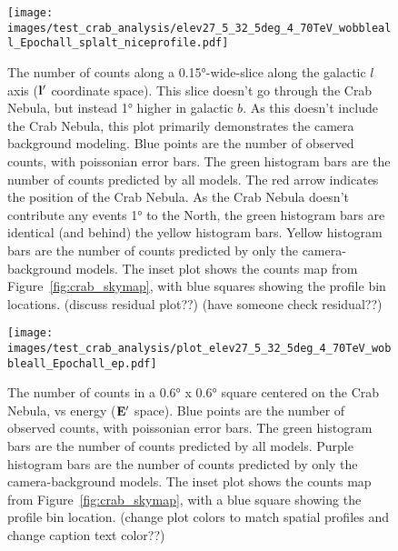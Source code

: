   \begin{figure}[!ht]
    \centering
    \texttt{[image: images/test\_crab\_analysis/elev27\_5\_32\_5deg\_4\_70TeV\_wobbleall\_Epochall\_splalt\_niceprofile.pdf]}
    \caption[Crab Nebula Profile along Galactic $l$ Off Source]
    {
      The number of counts along a \ang{0.15}-wide-slice along the galactic $l$ axis ($\mathbf{l'}$ coordinate space).
      This slice doesn't go through the Crab Nebula, but instead \ang{1} higher in galactic $b$.
      As this doesn't include the Crab Nebula, this plot primarily demonstrates the camera background modeling.
      Blue points are the number of observed counts, with poissonian error bars.
      The green histogram bars are the number of counts predicted by all models.
      The red arrow indicates the position of the Crab Nebula.
      As the Crab Nebula doesn't contribute any events \ang{1} to the North, the green histogram bars are identical (and behind) the yellow histogram bars.
      Yellow histogram bars are the number of counts predicted by only the camera-background models.
      The inset plot shows the counts map from Figure~\ref{fig:crab_skymap}, with blue squares showing the profile bin locations.
      {\color{red}(discuss residual plot??)}
      {\color{red}(have someone check residual??)}
    }
    \label{fig:crab_profile_l_off}
  \end{figure}

  \begin{figure}[!ht]
    \centering
    \texttt{[image: images/test\_crab\_analysis/plot\_elev27\_5\_32\_5deg\_4\_70TeV\_wobbleall\_Epochall\_ep.pdf]}
    \caption[Crab Nebula Profile in Energy]
    {
      The number of counts in a \ang{0.6} x \ang{0.6} square centered on the Crab Nebula, vs energy ($\mathbf{E'}$ space).
      Blue points are the number of observed counts, with poissonian error bars.
      The green histogram bars are the number of counts predicted by all models.
      Purple histogram bars are the number of counts predicted by only the camera-background models.
      The inset plot shows the counts map from Figure~\ref{fig:crab_skymap}, with a blue square showing the profile bin location.
      {\color{red}(change plot colors to match spatial profiles and change caption text color??)}
    }
    \label{fig:crab_profile_energy}
  \end{figure}
    
